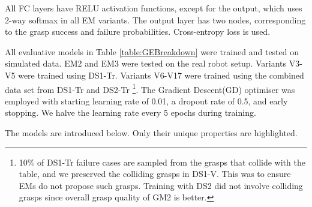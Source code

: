 All FC layers have RELU activation functions, except for the output, which uses 2-way softmax in all EM variants. The output layer has two nodes, corresponding to the grasp success and failure probabilities. Cross-entropy loss is used. %

All evaluative models in Table \ref{table:GEBreakdown} were trained and tested on simulated data. EM2 and EM3 were tested on the real robot setup. Variants V3-V5 were trained using DS1-Tr. Variants V6-V17 were trained using the combined data set from DS1-Tr and DS2-Tr \footnote{10\% of DS1-Tr failure cases are sampled from the grasps that collide with the table, and we preserved the colliding grasps in DS1-V. This was to ensure EMs do not propose such grasps. Training with DS2 did not involve colliding grasps since overall grasp quality of GM2 is better.}. The Gradient Descent(GD) optimiser was employed with starting learning rate of 0.01, a dropout rate of 0.5, and early stopping. We halve the learning rate every 5 epochs during training.


The models are introduced below. Only their unique properties are highlighted.

